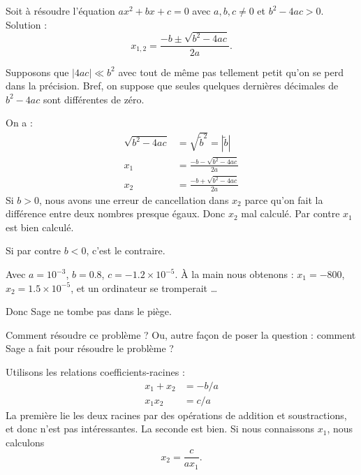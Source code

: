 \begin{example}
	Soit à résoudre l'équation \( ax^2+bx+c=0\) avec \( a,b,c\neq 0\) et \( b^2-4ac>0\). Solution :
	\begin{equation}
		x_{1,2}=\frac{ -b\pm\sqrt{b^2-4ac} }{ 2a }.
	\end{equation}

	Supposons que \( | 4ac |\ll b^2\) avec tout de même pas tellement petit qu'on se perd dans la précision. Bref, on suppose que seules quelques dernières décimales de \( b^2-4ac\) sont différentes de zéro.

	On a :
	\begin{subequations}
		\begin{align}
			\sqrt{b^2-4ac} & =\sqrt{\tilde b^2}= | \tilde b |  \\
			x_1            & =\frac{ -b-\sqrt{b^2-4ac} }{ 2a } \\
			x_2            & =\frac{ -b+\sqrt{b^2-4ac} }{ 2a }
		\end{align}
	\end{subequations}
	Si \( b>0\), nous avons une erreur de cancellation dans \( x_2\) parce qu'on fait la différence entre deux nombres presque égaux. Donc \( x_2\) mal calculé. Par contre \( x_1\) est bien calculé.


	Si par contre \( b<0\), c'est le contraire.


	Avec \( a=10^{-3}\), \( b=0.8\), \( c=-1.2\times 10^{-5}\). À la main nous obtenons : \( x_1=-800\), \( x_2=1.5\times 10^{-5}\), et un ordinateur se tromperait \ldots


	

	Donc Sage ne tombe pas dans le piège.
\end{example}

Comment résoudre ce problème ? Ou, autre façon de poser la question : comment Sage a fait pour résoudre le problème ?

Utilisons les relations coefficients-racines :
\begin{subequations}
	\begin{align}
		x_1+x_2 & =-b/a \\
		x_1x_2  & =c/a
	\end{align}
\end{subequations}
La première lie les deux racines par des opérations de addition et soustractions, et donc n'est pas intéressantes. La seconde est bien. Si nous connaissons \( x_1\), nous calculons
\begin{equation}
	x_2=\frac{ c }{ ax_1 }.
\end{equation}

